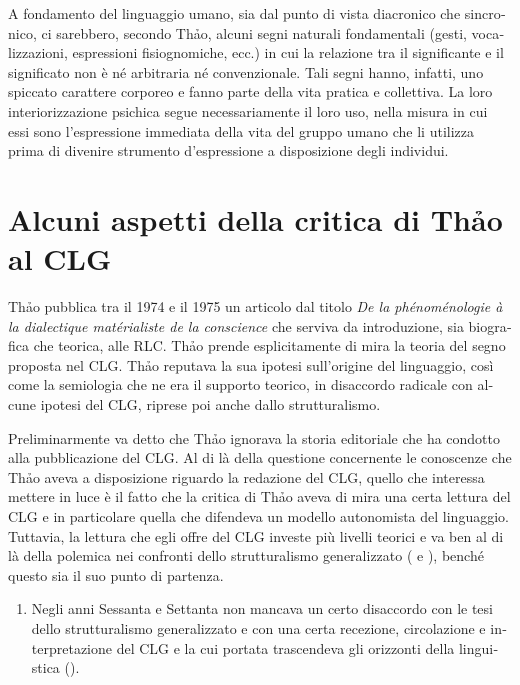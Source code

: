 \documentclass[output=paper]{../langscibook}
\begin{document}
\begin{otherlanguage}{italian}
A fondamento del linguaggio umano, sia dal punto di vista diacronico che sincronico, ci sarebbero, secondo Thảo, alcuni segni naturali fondamentali (gesti, vocalizzazioni, espressioni fisiognomiche, ecc.) in cui la relazione tra il significante e il significato non è né arbitraria né convenzionale. Tali segni hanno, infatti, uno spiccato carattere corporeo e fanno parte della vita pratica e collettiva. La loro interiorizzazione psichica segue necessariamente il loro uso, nella misura in cui essi sono l’espressione immediata della vita del gruppo umano che li utilizza prima di divenire strumento d’espressione a disposizione degli individui.

\section{Alcuni aspetti della critica di Thảo al CLG}

Thảo pubblica tra il 1974 e il 1975 un articolo dal titolo \textit{De la phénoménologie à la dialectique matérialiste de la conscience} che serviva da introduzione, sia biografica che teorica, alle RLC. Th\textlatin{ả}o prende esplicitamente di mira la teoria del segno proposta nel CLG. Th\textlatin{ả}o reputava la sua ipotesi sull’origine del linguaggio, così come la semiologia che ne era il supporto teorico, in disaccordo radicale con alcune ipotesi del CLG, riprese poi anche dallo strutturalismo.

Preliminarmente va detto che Th\textlatin{ả}o ignorava la storia editoriale che ha condotto alla pubblicazione del CLG. Al di là della questione concernente le conoscenze che Th\textlatin{ả}o aveva a disposizione riguardo la redazione del CLG, quello che interessa mettere in luce è il fatto che la critica di Th\textlatin{ả}o aveva di mira una certa lettura del CLG e in particolare quella che difendeva un modello autonomista del linguaggio. Tuttavia, la lettura che egli offre del CLG investe più livelli teorici e va ben al di là della polemica nei confronti dello strutturalismo generalizzato (\citealt{chiss_structuralisme_2015} e \citealt{leon_historiographie_2013}), benché questo sia il suo punto di partenza.

\begin{enumerate}
\renewcommand{\labelenumi}{{\alph{enumi}})}

\item Negli anni Sessanta e Settanta non mancava un certo disaccordo con le tesi dello strutturalismo generalizzato e con una certa recezione, circolazione e interpretazione del CLG e la cui portata trascendeva gli orizzonti della linguistica (\citealt{dosse_histoire_1991,dosse_histoire_1992,puech_lesprit_2013a,puech_lesprit_2013b,lepschy_linguistica_1966}).


\end{enumerate}
\end{otherlanguage}
\end{document}
